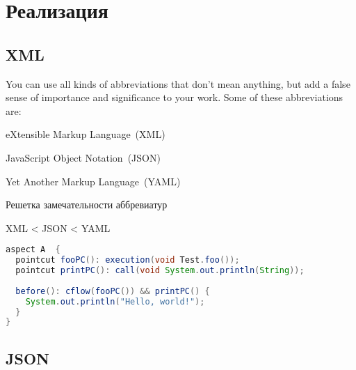 \chapter{Реализация}
\label{chap:impl}

\section{XML}

\blindtext

You can use all kinds of abbreviations that don't mean anything, but add
a false sense of importance and significance to your work. Some of these
abbreviations are:
%
\begin{itemize*}
\item eXtensible Markup Language~(XML)
\item JavaScript Object Notation~(JSON)
\item Yet Another Markup Language~(YAML)
\end{itemize*}
%

\begin{table}
\caption{Решетка замечательности аббревиатур}
\centering
XML < JSON < YAML
\end{table}

\Blindtext

  \begin{lstlisting}[language=Java, label={lst:aspectj_example}, 
  caption={Пример описания аспектов в AspectJ}]
aspect A  {
  pointcut fooPC(): execution(void Test.foo());
  pointcut printPC(): call(void System.out.println(String));
  
  before(): cflow(fooPC()) && printPC() {
    System.out.println("Hello, world!");
  }
}
  \end{lstlisting}

\section{JSON}

\Blindtext
